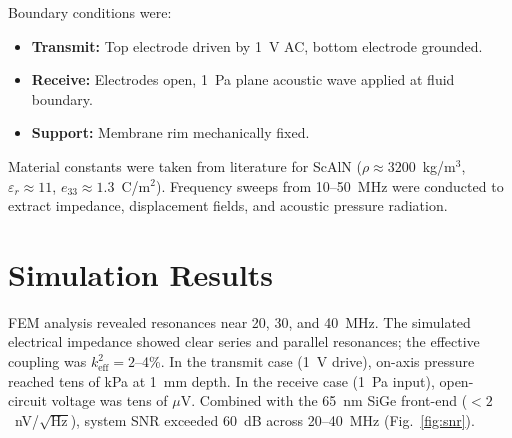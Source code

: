 \documentclass[conference]{IEEEtran}
\begin{document}
Boundary conditions were:
\begin{itemize}
  \item \textbf{Transmit:} Top electrode driven by 1~V AC, bottom electrode grounded.
  \item \textbf{Receive:} Electrodes open, 1~Pa plane acoustic wave applied at fluid boundary.
  \item \textbf{Support:} Membrane rim mechanically fixed.
\end{itemize}

Material constants were taken from literature for ScAlN ($\rho\!\approx\!3200$~kg/m$^3$, $\varepsilon_r\!\approx\!11$, $e_{33}\!\approx\!1.3$~C/m$^2$). Frequency sweeps from 10--50~MHz were conducted to extract impedance, displacement fields, and acoustic pressure radiation.

\section{Simulation Results}
FEM analysis revealed resonances near 20, 30, and 40~MHz. The simulated electrical impedance showed clear series and parallel resonances; the effective coupling was $k^2_{\mathrm{eff}}=2$--4\%. In the transmit case (1~V drive), on-axis pressure reached tens of kPa at 1~mm depth. In the receive case (1~Pa input), open-circuit voltage was tens of $\mu$V. Combined with the 65~nm SiGe front-end ($<2$~nV/$\sqrt{\mathrm{Hz}}$), system SNR exceeded 60~dB across 20--40~MHz (Fig.~\ref{fig:snr}).

\begin{minipage}{\columnwidth}
\centering
{}
\label{fig:imp}
\end{minipage}
\end{document}
